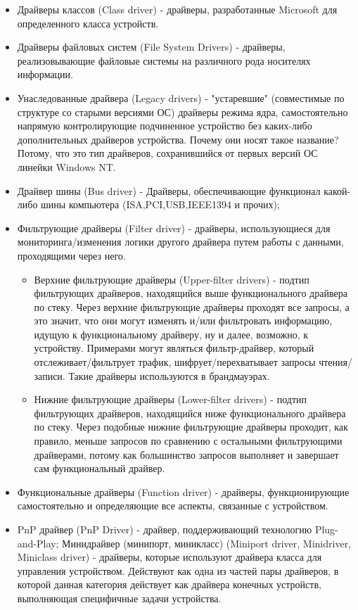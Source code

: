 \documentclass[14pt,a4paper]{article}
\begin{document}
\begin{itemize}
    \item Драйверы классов (Class driver) - драйверы, разработанные Microsoft для определенного класса устройств.
    \item  Драйверы файловых систем (File System Drivers) - драйверы, реализовывающие файловые системы на различного рода носителях информации.
\item  Унаследованные драйвера (Legacy drivers) - "устаревшие" (совместимые по структуре со старыми версиями ОС) драйверы режима ядра, самостоятельно напрямую контролирующие подчиненное устройство без каких-либо дополнительных драйверов устройства. Почему они носят такое название? Потому, что это тип драйверов, сохранившийся от первых версий ОС линейки Windows NT.
\item  Драйвер шины (Bus driver) - Драйверы, обеспечивающие функционал какой-либо шины компьютера (ISA,PCI,USB,IEEE1394 и прочих);
\item   Фильтрующие драйверы (Filter driver) - драйверы, использующиеся для мониторинга/изменения логики другого драйвера путем работы с данными, проходящими через него. \\ \begin{itemize}
\item Верхние фильтрующие драйверы (Upper-filter drivers) - подтип фильтрующих драйверов, находящийся выше функционального драйвера по стеку. Через верхние фильтрующие драйверы проходят все запросы, а это значит, что они могут изменять и/или фильтровать информацию, идущую к функциональному драйверу, ну и далее, возможно, к устройству. Примерами могут являться фильтр-драйвер, который отслеживает/фильтрует трафик, шифрует/перехватывает запросы чтения/записи. Такие драйверы используются в брандмауэрах. \\
\item Нижние фильтрующие драйверы (Lower-filter drivers) - подтип фильтрующих драйверов, находящийся ниже функционального драйвера по стеку. Через подобные нижние фильтрующие драйверы проходит, как правило, меньше запросов по сравнению с остальными фильтрующими драйверами, потому как большинство запросов выполняет и завершает сам функциональный драйвер. \end{itemize}
\item  Функциональные драйверы (Function driver) - драйверы, функционирующие самостоятельно и определяющие все аспекты, связанные с устройством.
\item  PnP драйвер (PnP Driver) - драйвер, поддерживающий технологию Plug-and-Play;
Минидрайвер (минипорт, миникласс) (Miniport driver, Minidriver, Miniclass driver) - драйверы, которые используют драйвера класса для управления устройством. Действуют как одна из частей пары драйверов, в которой данная категория действует как драйвера конечных устройств, выполняющая специфичные задачи устройства.
\end{itemize}
\end{document}
